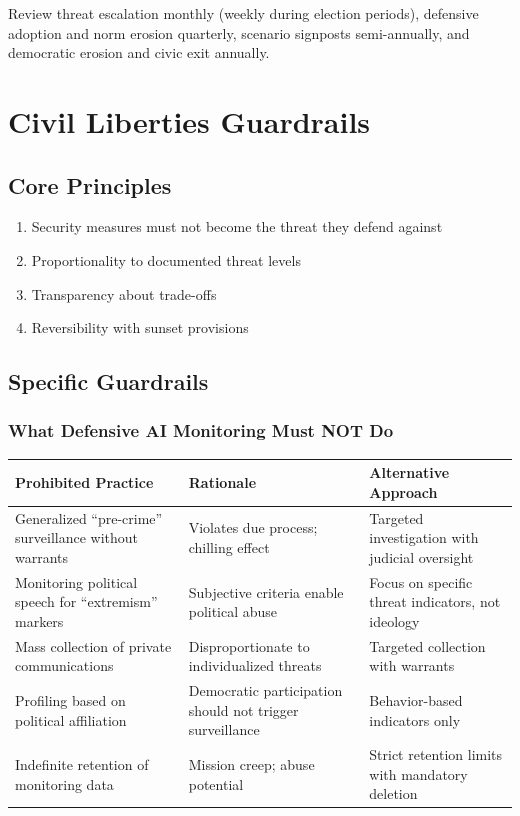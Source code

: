 \documentclass[11pt,letterpaper]{article}
\begin{document}
Review threat escalation monthly (weekly during election periods), defensive adoption and norm erosion quarterly, scenario signposts semi-annually, and democratic erosion and civic exit annually.

\section{Civil Liberties Guardrails}

\subsection{Core Principles}

\begin{enumerate}
  \item Security measures must not become the threat they defend against
  \item Proportionality to documented threat levels
  \item Transparency about trade-offs
  \item Reversibility with sunset provisions
\end{enumerate}

\subsection{Specific Guardrails}

\subsubsection{What Defensive AI Monitoring Must NOT Do}

{\small
\begin{longtable}{L{3.5cm}L{4cm}L{4.5cm}}
\toprule
\textbf{Prohibited Practice} & \textbf{Rationale} & \textbf{Alternative Approach} \\
\midrule
\endhead
\bottomrule
\endlastfoot
Generalized ``pre-crime'' surveillance without warrants & Violates due process; chilling effect & Targeted investigation with judicial oversight \\
Monitoring political speech for ``extremism'' markers & Subjective criteria enable political abuse & Focus on specific threat indicators, not ideology \\
Mass collection of private communications & Disproportionate to individualized threats & Targeted collection with warrants \\
Profiling based on political affiliation & Democratic participation should not trigger surveillance & Behavior-based indicators only \\
Indefinite retention of monitoring data & Mission creep; abuse potential & Strict retention limits with mandatory deletion \\
\end{longtable}}
\end{document}

